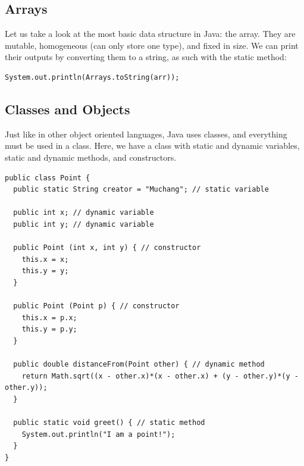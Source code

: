 \documentclass{article}
\theoremstyle{definition}
\theoremstyle{remark}
\theoremstyle{definition}
\begin{document}
\subsection{Arrays}

Let us take a look at the most basic data structure in Java: the array. They are mutable, homogeneous (can only store one type), and fixed in size. We can print their outputs by converting them to a string, as such with the static method: 
\begin{verbatim}
System.out.println(Arrays.toString(arr)); 
\end{verbatim}

\subsection{Classes and Objects}

Just like in other object oriented languages, Java uses classes, and everything must be used in a class. Here, we have a class with static and dynamic variables, static and dynamic methods, and constructors. 
\begin{verbatim}
public class Point {
  public static String creator = "Muchang"; // static variable 

  public int x; // dynamic variable
  public int y; // dynamic variable 

  public Point (int x, int y) { // constructor 
    this.x = x; 
    this.y = y; 
  }

  public Point (Point p) { // constructor
    this.x = p.x; 
    this.y = p.y; 
  }

  public double distanceFrom(Point other) { // dynamic method 
    return Math.sqrt((x - other.x)*(x - other.x) + (y - other.y)*(y - other.y)); 
  }
  
  public static void greet() { // static method 
    System.out.println("I am a point!"); 
  }
}
\end{verbatim}
\end{document}
